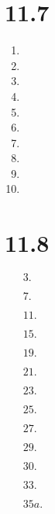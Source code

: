 \documentclass[12pt]{article}
\begin{document}
\section{11.7}
\begin{enumerate}
    \item
    \addtocounter{enumi}{3}\item
    \addtocounter{enumi}{3}\item
    \addtocounter{enumi}{3}\item
    \addtocounter{enumi}{3}\item
    \addtocounter{enumi}{3}\item
    \addtocounter{enumi}{3}\item
    \addtocounter{enumi}{3}\item
    \addtocounter{enumi}{3}\item
    \addtocounter{enumi}{3}\item
\end{enumerate}
\section{11.8}
\begin{enumerate}
    \item[$3.$]
    \item[$7.$]
    \item[$11.$]
    \item[$15.$]
    \item[$19.$]
    \item[$21.$]
    \item[$23.$]
    \item[$25.$]
    \item[$27.$]
    \item[$29.$]
    \item[$30.$]
    \item[$33.$]
    \item[$35a.$]
\end{enumerate}
\end{document}
